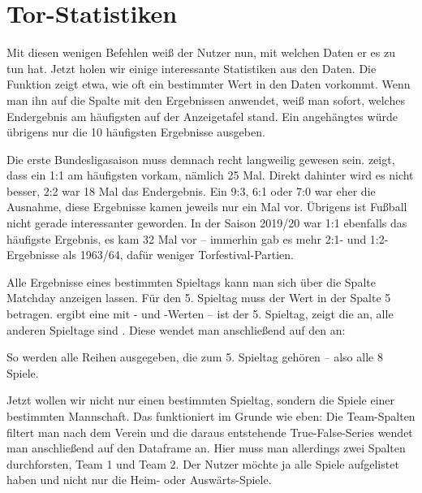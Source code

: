 \section{Tor-Statistiken}


Mit diesen wenigen Befehlen weiß der Nutzer nun, mit welchen Daten er es zu tun hat. Jetzt holen wir einige interessante Statistiken aus den Daten. Die Funktion  zeigt etwa, wie oft ein bestimmter Wert in den Daten vorkommt. Wenn man ihn auf die Spalte  mit den Ergebnissen anwendet, weiß man sofort, welches Endergebnis am häufigsten auf der Anzeigetafel stand. Ein angehängtes  würde übrigens nur die 10 häufigsten Ergebnisse ausgeben.

Die erste Bundesligasaison muss demnach recht langweilig gewesen sein.  zeigt, dass ein 1:1 am häufigsten vorkam, nämlich 25 Mal. Direkt dahinter wird es nicht besser, 2:2 war 18 Mal das Endergebnis. Ein 9:3, 6:1 oder 7:0 war eher die Ausnahme, diese Ergebnisse kamen jeweils nur ein Mal vor. Übrigens ist Fußball nicht gerade interessanter geworden. In der Saison 2019/20 war 1:1 ebenfalls das häufigste Ergebnis, es kam 32 Mal vor -- immerhin gab es mehr 2:1- und 1:2-Ergebnisse als 1963/64, dafür weniger Torfestival-Partien.

Alle Ergebnisse eines bestimmten Spieltags kann man sich über die Spalte Matchday anzeigen lassen. Für den 5. Spieltag muss der Wert in der Spalte 5 betragen.  ergibt eine  mit - und -Werten -- ist der 5. Spieltag, zeigt die   an, alle anderen Spieltage sind . Diese  wendet man anschließend auf den  an:

\medskip


\medskip

So werden alle Reihen ausgegeben, die zum 5. Spieltag gehören – also alle 8 Spiele.

Jetzt wollen wir nicht nur einen bestimmten Spieltag, sondern die Spiele einer bestimmten Mannschaft. Das funktioniert im Grunde wie eben: Die Team-Spalten filtert man nach dem Verein und die daraus entstehende True-False-Series wendet man anschließend auf den Dataframe an. Hier muss man allerdings zwei Spalten durchforsten, Team 1 und Team 2. Der Nutzer möchte ja alle Spiele aufgelistet haben und nicht nur die Heim- oder Auswärts-Spiele.


